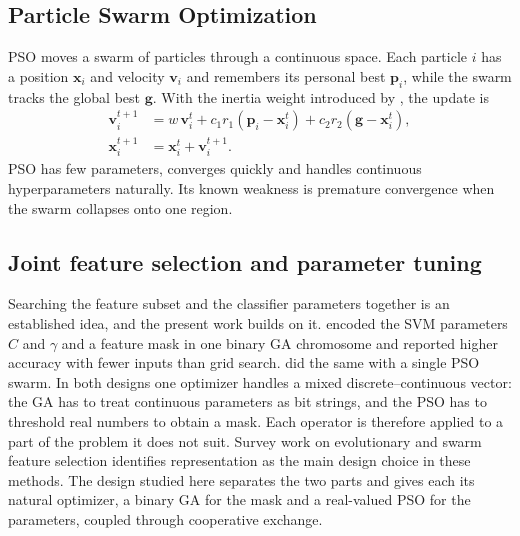 \documentclass[MTech]{ugthesis}
\begin{document}
\subsection{Particle Swarm Optimization}
PSO \citep{kennedy1995pso} moves a swarm of particles through a continuous space. Each particle $i$ has a position $\mathbf{x}_i$ and velocity $\mathbf{v}_i$ and remembers its personal best $\mathbf{p}_i$, while the swarm tracks the global best $\mathbf{g}$. With the inertia weight introduced by \citet{shi1998inertia}, the update is
\begin{align}
\mathbf{v}_i^{t+1} &= w\,\mathbf{v}_i^{t} + c_1 r_1 (\mathbf{p}_i - \mathbf{x}_i^{t}) + c_2 r_2 (\mathbf{g} - \mathbf{x}_i^{t}), \label{eq:psov}\\
\mathbf{x}_i^{t+1} &= \mathbf{x}_i^{t} + \mathbf{v}_i^{t+1}. \label{eq:psox}
\end{align}
PSO has few parameters, converges quickly and handles continuous hyperparameters naturally. Its known weakness is premature convergence when the swarm collapses onto one region.

\subsection{Joint feature selection and parameter tuning}
Searching the feature subset and the classifier parameters together is an established idea, and the present work builds on it. \citet{huang2006gasvm} encoded the SVM parameters $C$ and $\gamma$ and a feature mask in one binary GA chromosome and reported higher accuracy with fewer inputs than grid search. \citet{lin2008psosvm} did the same with a single PSO swarm. In both designs one optimizer handles a mixed discrete--continuous vector: the GA has to treat continuous parameters as bit strings, and the PSO has to threshold real numbers to obtain a mask. Each operator is therefore applied to a part of the problem it does not suit. Survey work on evolutionary and swarm feature selection \citep{xue2016fssurvey,nguyen2020sifs} identifies representation as the main design choice in these methods. The design studied here separates the two parts and gives each its natural optimizer, a binary GA for the mask and a real-valued PSO for the parameters, coupled through cooperative exchange.
\end{document}
